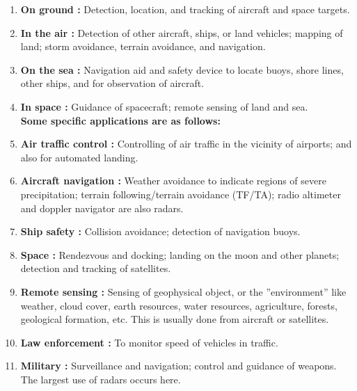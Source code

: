 \documentclass[12pt]{article} %
\begin{document}
 \begin{enumerate}
\item \textbf {On ground :} Detection, location, and tracking of aircraft and space targets.

\item \textbf {In the air :} Detection of other aircraft, ships, or land vehicles; mapping of land; storm avoidance, terrain avoidance, and navigation.

\item \textbf {On the sea :} Navigation aid and safety device to locate buoys, shore lines, other ships, and for observation of aircraft.

\item \textbf {In space :} Guidance of spacecraft; remote sensing of land and sea.
\newline
\\ \textbf{Some specific applications are as follows:}

\item \textbf {Air traffic control :} Controlling of air traffic in the vicinity of airports; and also for automated landing.

\item \textbf {Aircraft navigation :} Weather avoidance to indicate regions of severe precipitation; terrain following/terrain avoidance (TF/TA); radio altimeter and doppler navigator are also radars.

\item \textbf {Ship safety :} Collision avoidance; detection of navigation buoys.

\item \textbf {Space :} Rendezvous and docking; landing on the moon and other planets; detection and tracking of satellites.

\item \textbf {Remote sensing :} Sensing of geophysical object, or the ”environment” like weather, cloud cover, earth resources, water resources, agriculture, forests, geological formation, etc. This is usually done from aircraft or satellites.

\item \textbf {Law enforcement :} To monitor speed of vehicles in traffic.

\item \textbf {Military :} Surveillance and navigation; control and guidance of weapons. The largest use of radars occurs here.

\end{enumerate}
\end{document}

